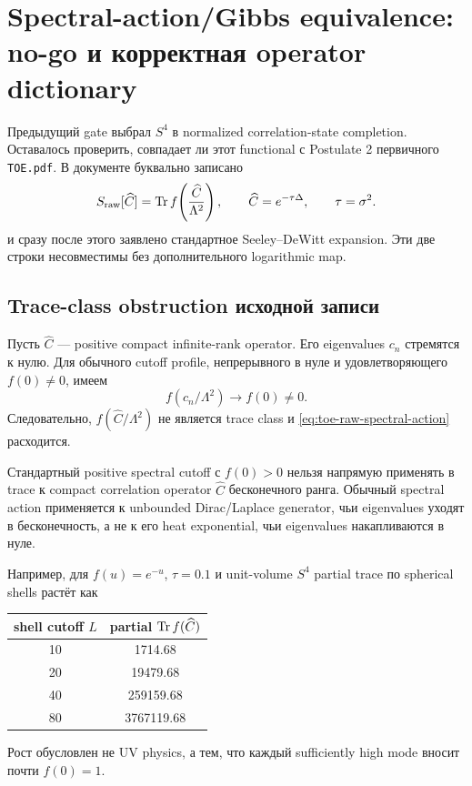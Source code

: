 \chapter[Spectral/Gibbs no-go и operator dictionary]
{Spectral-action/Gibbs equivalence: no-go и корректная operator dictionary}

Предыдущий gate выбрал \(S^4\) в normalized correlation-state completion.
Оставалось проверить, совпадает ли этот functional с Postulate 2 первичного
\texttt{TOE.pdf}. В документе буквально записано
\begin{equation}
 S_{\rm raw}[\widehat C]
 =\operatorname{Tr} f\!\left(\frac{\widehat C}{\Lambda^2}\right),
 \qquad
 \widehat C=e^{-\tau\Delta},
 \qquad \tau=\sigma^2.
 \label{eq:toe-raw-spectral-action}
\end{equation}
и сразу после этого заявлено стандартное Seeley--DeWitt expansion. Эти две
строки несовместимы без дополнительного logarithmic map.

\section{Trace-class obstruction исходной записи}

Пусть \(\widehat C\) --- positive compact infinite-rank operator. Его
eigenvalues \(c_n\) стремятся к нулю. Для обычного cutoff profile,
непрерывного в нуле и удовлетворяющего \(f(0)\ne0\), имеем
\begin{equation}
 f(c_n/\Lambda^2)\longrightarrow f(0)\ne0.
\end{equation}
Следовательно, \(f(\widehat C/\Lambda^2)\) не является trace class и
\eqref{eq:toe-raw-spectral-action} расходится.

\begin{theorem}
Стандартный positive spectral cutoff с \(f(0)>0\) нельзя напрямую применять
в trace к compact correlation operator \(\widehat C\) бесконечного ранга.
Обычный spectral action применяется к unbounded Dirac/Laplace generator,
чьи eigenvalues уходят в бесконечность, а не к его heat exponential, чьи
eigenvalues накапливаются в нуле.
\end{theorem}

Например, для \(f(u)=e^{-u}\), \(\tau=0.1\) и unit-volume \(S^4\) partial
trace по spherical shells растёт как
\begin{center}
\begin{tabular}{cc}
\toprule
shell cutoff \(L\) & partial \(\operatorname{Tr} f(\widehat C)\) \\
\midrule
10 & 1714.68 \\
20 & 19479.68 \\
40 & 259159.68 \\
80 & 3767119.68 \\
\bottomrule
\end{tabular}
\end{center}
Рост обусловлен не UV physics, а тем, что каждый sufficiently high mode
вносит почти \(f(0)=1\).


